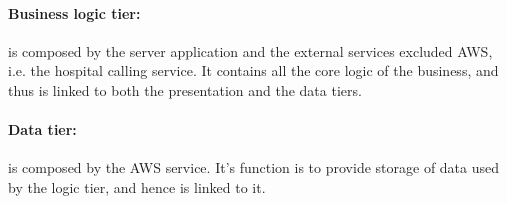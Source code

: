 \paragraph{Business logic tier:} is composed by the server application and the external services excluded AWS, i.e. the hospital calling service. It contains all the core logic of the business, and thus is linked to both the presentation and the data tiers.

\paragraph{Data tier:} is composed by the AWS service. It's function is to provide storage of data used by the logic tier, and hence is linked to it.